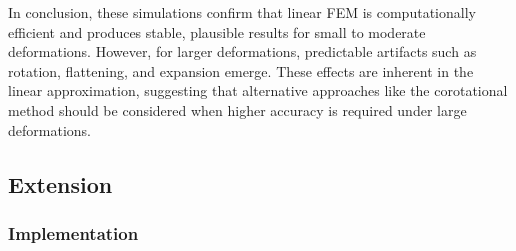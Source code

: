 \documentclass[11pt,a4paper]{article}
\begin{document}
In conclusion, these simulations confirm that linear FEM is computationally efficient and produces stable, plausible results for small to moderate deformations. However, for larger deformations, predictable artifacts such as rotation, flattening, and expansion emerge. These effects are inherent in the linear approximation, suggesting that alternative approaches like the corotational method should be considered when higher accuracy is required under large deformations.



\subsection*{Extension}

\subsubsection*{Implementation}
\end{document}
